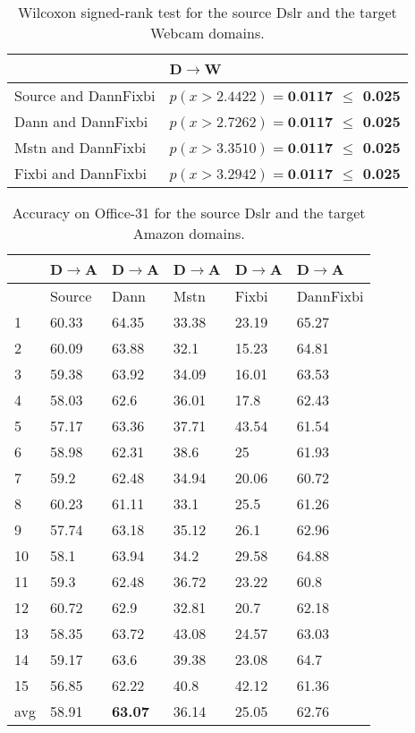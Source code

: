 \begin{table}[H]
\centering
\caption{Wilcoxon signed-rank test for the source Dslr and the target Webcam domains.}
\label{tab:DW_wil}
\begin{tabular}{|l|l|}
\hline
 & D$\rightarrow$W \\ \hline
Source and DannFixbi & \textbf{$p(x > 2.4422) = \textbf{0.0117}$ $\leq$ 0.025} \\ \hline
Dann and DannFixbi & \textbf{$p(x > 2.7262) = \textbf{0.0117} $ $\leq$ 0.025} \\ \hline
Mstn and DannFixbi & \textbf{$p(x > 3.3510) = \textbf{0.0117}$ $\leq$ 0.025} \\ \hline
Fixbi and DannFixbi & \textbf{$p(x > 3.2942) = \textbf{0.0117}$ $\leq$ 0.025} \\ \hline
\end{tabular}
\end{table} 

\begin{table}[H]
\centering
\caption{Accuracy on Office-31 for the source Dslr and the target Amazon domains.}
\label{tab:DA}
\begin{tabular}{|p{2cm}|p{2cm}|p{2cm}|p{2cm}|p{2cm}|p{2cm}|}
\hline
   & D$\rightarrow$A & D$\rightarrow$A & D$\rightarrow$A & D$\rightarrow$A & D$\rightarrow$A \\ \hline
 & Source & Dann & Mstn & Fixbi & DannFixbi \\ \hline
1 & 60.33 & 64.35 & 33.38 & 23.19 & 65.27 \\ \hline
2 & 60.09 & 63.88 & 32.1 & 15.23 & 64.81 \\ \hline
3 & 59.38 & 63.92 & 34.09 & 16.01 & 63.53 \\ \hline
4 & 58.03 & 62.6 & 36.01 & 17.8 & 62.43 \\ \hline
5 & 57.17 & 63.36 & 37.71 & 43.54 & 61.54 \\ \hline
6 & 58.98 & 62.31 & 38.6 & 25 & 61.93 \\ \hline
7 & 59.2 & 62.48 & 34.94 & 20.06 & 60.72 \\ \hline
8 & 60.23 & 61.11 & 33.1 & 25.5 & 61.26 \\ \hline
9 & 57.74 & 63.18 & 35.12 & 26.1 & 62.96 \\ \hline
10 & 58.1 & 63.94 & 34.2 & 29.58 & 64.88 \\ \hline
11 & 59.3 & 62.48 & 36.72 & 23.22 & 60.8 \\ \hline
12 & 60.72 & 62.9 & 32.81 & 20.7 & 62.18 \\ \hline
13 & 58.35 & 63.72 & 43.08 & 24.57 & 63.03 \\ \hline
14 & 59.17 & 63.6 & 39.38 & 23.08 & 64.7 \\ \hline
15 & 56.85 & 62.22 & 40.8 & 42.12 & 61.36 \\ \hline
avg & 58.91 & \textbf{63.07} & 36.14 & 25.05 & 62.76 \\ \hline
\end{tabular}
\end{table}


